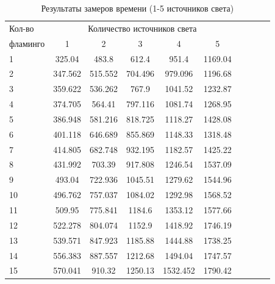 \begin{table}[htbp]
	\centering
	\caption{Результаты замеров времени (1-5 источников света)}
	\label{tbl:time1}
	\begin{tabular}{|p{2cm}|c|c|c|c|c|c|c|c|c|}
		\hline
		Кол-во & \multicolumn{5}{c|}{Количество источников света} \\ \cline{2-6} 
		фламинго & 1 & 2 & 3 & 4 & 5 \\ \hline
		1 & 325.04 & 483.8 & 612.4 & 951.4 & 1169.04 \\ \hline
		2 & 347.562 & 515.552 & 704.496 & 979.096 & 1196.68 \\ \hline
		3 & 359.622 & 536.262 & 767.9 & 1041.52 & 1232.87 \\ \hline
		4 & 374.705 & 564.41 & 797.116 & 1081.74 & 1268.95 \\ \hline
		5 & 386.948 & 581.216 & 818.725 & 1118.27 & 1428.08 \\ \hline
		6 & 401.118 & 646.689 & 855.869 & 1148.33 & 1318.48 \\ \hline
		7 & 414.805 & 682.748 & 932.195 & 1182.57 & 1425.22 \\ \hline
		8 & 431.992 & 703.39 & 917.808 & 1246.54 & 1537.09 \\ \hline
		9 & 493.04 & 722.936 & 1045.51 & 1279.62 & 1544.96 \\ \hline
		10 & 496.762 & 757.037 & 1084.02 & 1292.98 & 1568.52 \\ \hline
		11 & 509.95 & 775.841 & 1184.6 & 1353.12 & 1577.66 \\ \hline
		12 & 522.278 & 804.074 & 1152.9 & 1418.92 & 1746.19 \\ \hline
		13 & 539.571 & 847.923 & 1185.88 & 1444.88 & 1738.25 \\ \hline
		14 & 556.383 & 887.557 & 1212.68 & 1494.04 & 1747.57 \\ \hline
		15 & 570.041 & 910.32 & 1250.13 & 1532.452 & 1790.42 \\ \hline
	\end{tabular}
\end{table}

